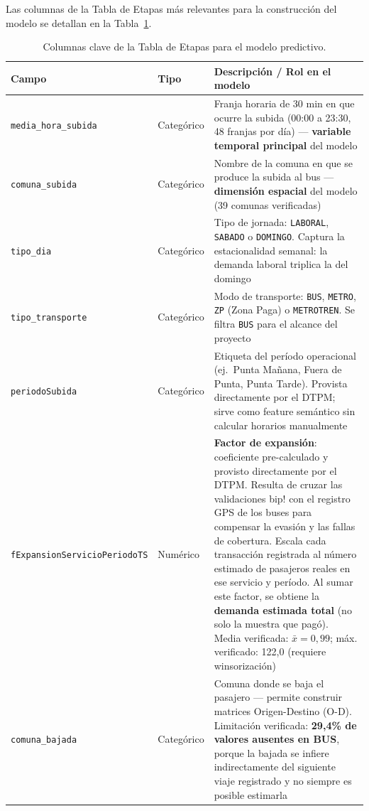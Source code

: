 \documentclass[11pt,letterpaper]{article}
\begin{document}
\noindent Las columnas de la Tabla de Etapas más relevantes para la construcción del modelo se detallan en la Tabla~\ref{tab:columnas}.

\begin{table}[h!]
\centering
\small
\renewcommand{\arraystretch}{1.25}
\begin{tabular}{@{}l l p{7cm}@{}}
\toprule
\rowcolor{primary!12}
\textbf{Campo} & \textbf{Tipo} & \textbf{Descripción / Rol en el modelo} \\
\midrule
\texttt{media\_hora\_subida}        & Categórico & Franja horaria de 30 min en que ocurre la subida (00:00 a 23:30, 48 franjas por día) — \textbf{variable temporal principal} del modelo \\
\texttt{comuna\_subida}             & Categórico & Nombre de la comuna en que se produce la subida al bus — \textbf{dimensión espacial} del modelo (39 comunas verificadas) \\
\texttt{tipo\_dia}                  & Categórico & Tipo de jornada: \texttt{LABORAL}, \texttt{SABADO} o \texttt{DOMINGO}. Captura la estacionalidad semanal: la demanda laboral triplica la del domingo \\
\texttt{tipo\_transporte}           & Categórico & Modo de transporte: \texttt{BUS}, \texttt{METRO}, \texttt{ZP} (Zona Paga) o \texttt{METROTREN}. Se filtra \texttt{BUS} para el alcance del proyecto \\
\texttt{periodoSubida}              & Categórico & Etiqueta del período operacional (ej.\ Punta Mañana, Fuera de Punta, Punta Tarde). Provista directamente por el DTPM; sirve como feature semántico sin calcular horarios manualmente \\
\texttt{fExpansionServicioPeriodoTS}& Numérico   & \textbf{Factor de expansión}: coeficiente pre-calculado y provisto directamente por el DTPM. Resulta de cruzar las validaciones bip! con el registro GPS de los buses para compensar la evasión y las fallas de cobertura. Escala cada transacción registrada al número estimado de pasajeros reales en ese servicio y período. Al sumar este factor, se obtiene la \textbf{demanda estimada total} (no solo la muestra que pagó). Media verificada: $\bar{x}=0{,}99$; máx. verificado: 122{,}0 (requiere winsorización) \\
\texttt{comuna\_bajada}             & Categórico & Comuna donde se baja el pasajero — permite construir matrices Origen-Destino (O-D). Limitación verificada: \textbf{29{,}4\% de valores ausentes en BUS}, porque la bajada se infiere indirectamente del siguiente viaje registrado y no siempre es posible estimarla \\
\bottomrule
\end{tabular}
\caption{Columnas clave de la Tabla de Etapas para el modelo predictivo.}
\label{tab:columnas}
\end{table}
\end{document}
